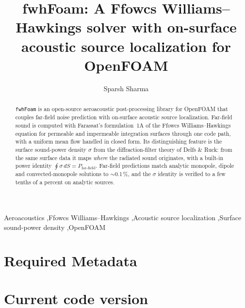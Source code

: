 \documentclass[preprint,12pt,a4paper]{elsarticle}
\begin{document}
\begin{frontmatter}

\title{fwhFoam: A Ffowcs Williams--Hawkings solver with on-surface
acoustic source localization for OpenFOAM}

\author[dlr]{Sparsh Sharma}
\address[dlr]{German Aerospace Center (DLR), Germany}

\begin{abstract}
\texttt{fwhFoam} is an open-source aeroacoustic post-processing library for
OpenFOAM that couples far-field noise prediction with on-surface acoustic
source localization. Far-field sound is computed with Farassat's
formulation~1A of the Ffowcs Williams--Hawkings equation for permeable and
impermeable integration surfaces through one code path, with a uniform mean
flow handled in closed form. Its distinguishing feature is the surface
sound-power density $\sigma$ from the diffraction-filter theory of Delfs
\& Ruck: from the same surface data it maps \emph{where} the radiated sound
originates, with a built-in power identity
$\oint\sigma\,dS = P_\mathrm{far\text{-}field}$. Far-field predictions match
analytic monopole, dipole and convected-monopole solutions to
$\sim$0.1\,\%, and the $\sigma$ identity is verified to a few tenths of a
percent on analytic sources.
\end{abstract}

\begin{keyword}
Aeroacoustics \sep Ffowcs Williams--Hawkings \sep Acoustic source
localization \sep Surface sound-power density \sep OpenFOAM
\end{keyword}

\end{frontmatter}

\section*{Required Metadata}

\section*{Current code version}
\end{document}
